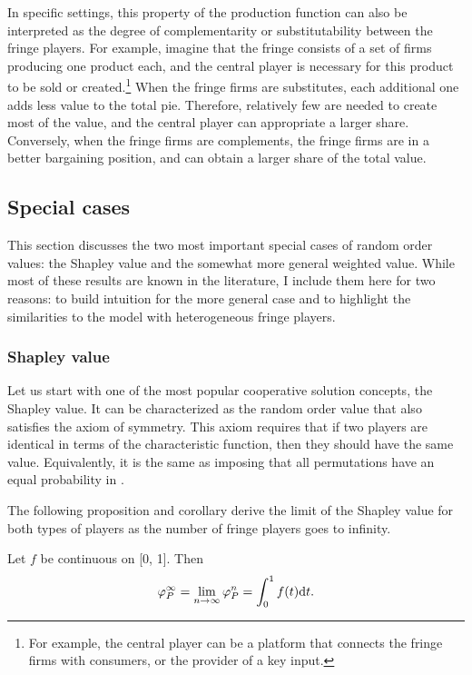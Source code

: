 In specific settings, this property of the production function can also be interpreted as the degree of complementarity or substitutability between the fringe players.
For example, imagine that the fringe consists of a set of firms producing one product each, and the central player is necessary for this product to be sold or created.\footnote{
    For example, the central player can be a platform that connects the fringe firms with consumers, or the provider of a key input.
}
When the fringe firms are substitutes, each additional one adds less value to the total pie.
Therefore, relatively few are needed to create most of the value, and the central player can appropriate a larger share.
Conversely, when the fringe firms are complements, the fringe firms are in a better bargaining position, and can obtain a larger share of the total value.


\subsection{Special cases}

This section discusses the two most important special cases of random order values: the Shapley value and the somewhat more general weighted value.
While most of these results are known in the literature, I include them here for two reasons: to build intuition for the more general case and to highlight the similarities to the model with heterogeneous fringe players.

\subsubsection{Shapley value}

Let us start with one of the most popular cooperative solution concepts, the Shapley value.
It can be characterized as the random order value that also satisfies the axiom of symmetry.
This axiom requires that if two players are identical in terms of the characteristic function, then they should have the same value.
Equivalently, it is the same as imposing that all permutations have an equal probability in .

The following proposition and corollary derive the limit of the Shapley value for both types of players as the number of fringe players goes to infinity.

\begin{proposition}
    \label{prop:one_sided}
    Let $f$ be continuous on [0, 1]. Then
    \begin{align*}
        \varphi_P^\infty = \lim_{n \to \infty} \varphi_P^n = \int_0^1 f(t) \mathrm{d}t .
    \end{align*}
\end{proposition}

